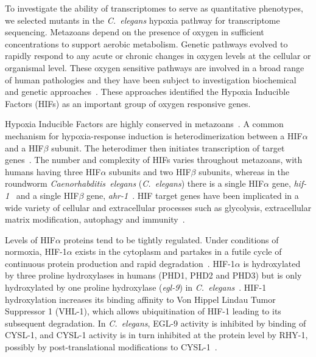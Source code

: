 \documentclass[9pt,twocolumn,twoside]{pnas-new}
\newcommand{\cel}{\emph{C.~elegans}}
\newcommand{\egl}{\emph{egl-9}}
\newcommand{\hif}{\emph{hif-1}}
\newcommand{\eglp}{EGL-9}
\newcommand{\rhyp}{RHY-1}
\newcommand{\vhlp}{VHL-1}
\newcommand{\hifp}{HIF-1}
\newcommand{\cyslp}{CYSL-1}
\begin{document}
To investigate the ability of transcriptomes to serve as quantitative phenotypes,
we selected mutants in the \cel{} hypoxia pathway for transcriptome sequencing.
Metazoans depend on the presence of oxygen in sufficient concentrations to
support aerobic metabolism. Genetic pathways evolved to rapidly respond to any
acute or chronic changes in oxygen levels at the cellular or organismal level.
These oxygen sensitive pathways are involved in a broad range of human
pathologies and they have been subject to investigation biochemical and
genetic approaches~\cite{Semenza2012}. These approaches identified the Hypoxia
Inducible Factors (HIFs) as an important group of oxygen responsive genes.

Hypoxia Inducible Factors are highly conserved in metazoans~\cite{Loenarz2011}.
A common mechanism for hypoxia-response induction is heterodimerization between a
HIF$\alpha$ and a HIF$\beta$ subunit. The heterodimer then initiates
transcription of target genes~\cite{Jiang1996}. The number and complexity of HIFs varies
throughout metazoans, with humans having three HIF$\alpha$ subunits and two
HIF$\beta$ subunits, whereas in the roundworm \emph{Caenorhabditis~elegans}
(\cel{}) there is a single HIF$\alpha$ gene, \hif{}~\cite{Jiang2001} and a single HIF$\beta$
gene, \emph{ahr-1}~\cite{Powell-Coffman1998}. HIF target genes have been implicated
in a wide variety of cellular and extracellular processes such as glycolysis,
extracellular matrix modification, autophagy and immunity~\cite{Semenza1994,
Bishop2004,Shen2005,Bellier2009,Semenza2012}.

Levels of HIF$\alpha$ proteins tend to be tightly regulated. Under conditions of
normoxia, \hifp{}$\alpha$ exists in the cytoplasm and partakes in a futile cycle
of continuous protein production and rapid degradation~\cite{Huang1996}.
\hifp{}$\alpha$ is hydroxylated by three proline hydroxylases
in humans (PHD1, PHD2 and PHD3) but is only hydroxylated by one proline
hydroxylase (\egl{}) in \cel{}~\cite{Kaelin2008}. \hifp{} hydroxylation increases its
binding affinity to Von Hippel Lindau Tumor Suppressor 1 (\vhlp{}), which allows
ubiquitination of \hifp{} leading to its subsequent degradation. In \cel{},
\eglp{} activity is inhibited by binding of \cyslp{}, and \cyslp{} activity is
in turn inhibited at the protein level by \rhyp{}, possibly by
post-translational modifications to \cyslp{}~\cite{Ma2012}.
\end{document}
